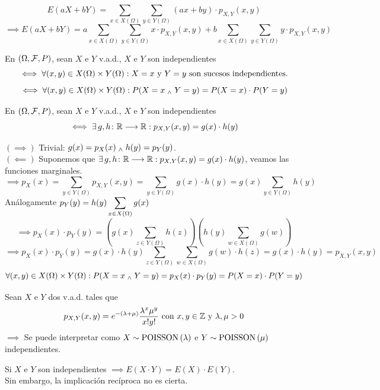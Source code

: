 \begin{ejem}[$E(aX+bY)=aE(X)+bE(Y)$]
	\[E(aX+bY)=\sum_{x\in X(\Omega)} \sum_{y\in Y(\Omega)} (ax+by)\cdot p_{X,Y}(x,y)\]
	\[\implies E(aX+bY)=a\sum_{x\in X(\Omega)} \sum_{y\in Y(\Omega)} x\cdot p_{X,Y}(x,y) + b\sum_{x\in X(\Omega)} \sum_{y\in Y(\Omega)} y\cdot p_{X,Y}(x,y)\]
\end{ejem}
\begin{defn}[Independencia de v.a.d.]
	En $(\Omega, \mathcal{F}, P)$, sean $X$ e $Y$ v.a.d., $X$ e $Y$ son independientes
	\[\iff \forall (x,y) \in X(\Omega)\times Y(\Omega) : {X=x} \text{ y } {Y=y} \text{ son sucesos independientes.}\]
	\[\iff \forall (x,y) \in X(\Omega)\times Y(\Omega) : P(X=x\; _{\wedge} \; Y=y)=P(X=x)\cdot P(Y=y)\]
\end{defn}
\begin{teo}
	En $(\Omega, \mathcal{F}, P)$, sean $X$ e $Y$ v.a.d., $X$ e $Y$ son independientes
	\[\iff \exists \, g, h \colon \mathbb{R} \longrightarrow \mathbb{R} : p_{X,Y}(x,y)=g(x)\cdot h(y)\]
	\begin{dem}
		$(\implies)$ Trivial: $g(x)=p_X(x) \; _{\wedge} \; h(y)=p_Y(y)$.\\
		$(\impliedby)$ Suponemos que $\exists \, g, h \colon \mathbb{R} \longrightarrow \mathbb{R} : p_{X,Y}(x,y)=g(x)\cdot h(y)$, veamos las funciones marginales.
		\[\implies p_X(x) = \sum_{y\in Y(\Omega)} p_{X, Y}(x,y) = \sum_{y\in Y(\Omega)} g(x)\cdot h(y) = g(x) \sum_{y\in Y(\Omega)} h(y)\]
		Análogamente $\displaystyle p_Y(y)=h(y) \sum_{x\in X(\Omega)} g(x)$
		\[\implies p_X(x)\cdot p_Y(y) = \left(g(x) \sum_{z\in Y(\Omega)} h(z)\right)\left(h(y) \sum_{w\in X(\Omega)} g(w)\right)\]
		\[\implies p_X(x)\cdot p_Y(y) = g(x)\cdot h(y) \sum_{z\in Y(\Omega)} \sum_{w\in X(\Omega)} g(w)\cdot h(z) = g(x)\cdot h(y) =p_{X, Y}(x, y)\]
		\[\forall (x, y) \in X(\Omega) \times Y(\Omega) : P(X=x \; _{\wedge} \; Y=y) = p_{X}(x) \cdot p_Y(y) = P(X=x) \cdot P(Y=y)\]
	\end{dem}
\end{teo}
\begin{ejem}
	Sean $X$ e $Y$ dos v.a.d. tales que
	\[p_{X, Y}(x,y) = e^{-(\lambda+\mu)}\frac{\lambda^x\mu^y}{x! y!} \text{ con } x,y \in \mathbb{Z} \text{ y } \lambda, \mu >0\]
	$\implies$ Se puede interpretar como $X\sim\operatorname{POISSON}\left(\lambda\right)$ e $Y\sim\operatorname{POISSON}\left(\mu\right)$ independientes.
\end{ejem}

\begin{obs}
	Si $X$ e $Y$ son independientes $\implies E(X\cdot Y)=E(X)\cdot E(Y)$. \\
	Sin embargo, la implicación recíproca no es cierta. \hfill {}
\end{obs}

